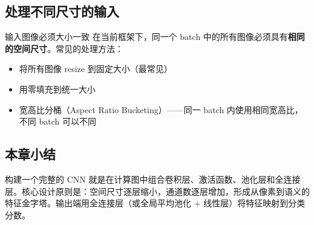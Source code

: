 \subsection{处理不同尺寸的输入}

\begin{warningbox}{输入图像必须大小一致}
在当前框架下，同一个 batch 中的所有图像必须具有\textbf{相同的空间尺寸}。常见的处理方法：
\begin{itemize}
    \item 将所有图像 resize 到固定大小（最常见）
    \item 用零填充到统一大小
    \item 宽高比分桶（Aspect Ratio Bucketing）——同一 batch 内使用相同宽高比，不同 batch 可以不同
\end{itemize}
\end{warningbox}

\subsection{本章小结}

构建一个完整的 CNN 就是在计算图中组合卷积层、激活函数、池化层和全连接层。核心设计原则是：空间尺寸逐层缩小，通道数逐层增加，形成从像素到语义的特征金字塔。输出端用全连接层（或全局平均池化 + 线性层）将特征映射到分类分数。


